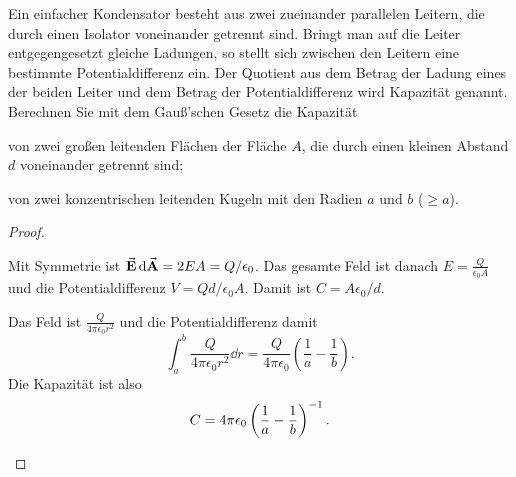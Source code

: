 \begin{Problem}
Ein einfacher Kondensator besteht aus zwei zueinander parallelen Leitern, die durch einen Isolator voneinander getrennt sind. Bringt man auf die Leiter entgegengesetzt gleiche Ladungen, so stellt sich zwischen den Leitern eine bestimmte Potentialdifferenz ein. Der Quotient aus dem Betrag der Ladung eines der beiden Leiter und dem Betrag der Potentialdifferenz wird Kapazität genannt. Berechnen Sie mit dem Gauß’schen Gesetz die Kapazität	
\begin{parts}
\item von zwei großen leitenden Flächen der Fläche $A$, die durch einen kleinen Abstand $d$ voneinander getrennt sind;
\item von zwei konzentrischen leitenden Kugeln mit den Radien $a$ und $b$ ($\ge a$). 
\end{parts}
\end{Problem}
\begin{proof}
	\begin{parts}
	\item Mit Symmetrie ist $\va E \dd{\va A}=2EA=Q / \epsilon_0$. Das gesamte Feld ist danach  $E = \frac{Q}{\epsilon_0 A}$ und die Potentialdifferenz $V=Qd / \epsilon_0 A$. Damit ist $C=A\epsilon_0 / d$.
	\item Das Feld ist $\frac{Q}{4\pi\epsilon_0 r^2}$ und die Potentialdifferenz damit
		\[
			\int_a^b \frac{Q}{4\pi\epsilon_{0}r^2}\dd{r}=\frac{Q}{4\pi\epsilon_0}\left( \frac{1}{a}-\frac{1}{b} \right) 
		.\] 
		Die Kapazität ist also
		\[
			C=4\pi\epsilon_0\left( \frac{1}{a}-\frac{1}{b} \right)^{-1}
		.\qedhere\] 
	\end{parts}
\end{proof}
